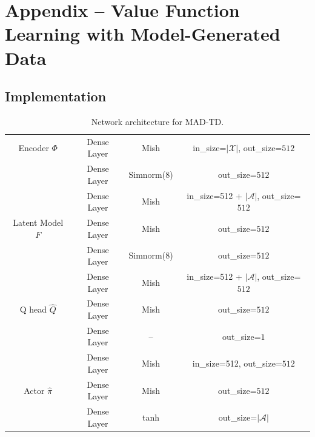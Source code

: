 \chapter{Appendix -- Value Function Learning with Model-Generated Data}

\section{Implementation}
\label{app:implementation}

\begin{table}[t]
\begin{center}
\begin{tabular}{c|c|c|c}
     Encoder $\Phi$ & Dense Layer & Mish & in\_size=$|\mathcal{X}|$, out\_size=$512$ \\
     & Dense Layer & Simnorm(8) & out\_size=$512$\\\hline
     
     & Dense Layer & Mish &in\_size=512 + $|\mathcal{A}|$, out\_size=$512$ \\
     Latent Model $F$ & Dense Layer & Mish & out\_size=$512$\\\
     & Dense Layer & Simnorm(8) &out\_size=$512$\\\hline
     
     & Dense Layer & Mish &in\_size=512 + $|\mathcal{A}|$, out\_size=$512$ \\
     Q head $\hat{Q}$& Dense Layer & Mish & out\_size=$512$\\
     & Dense Layer & -- & out\_size=$1$\\\hline

     & Dense Layer & Mish &in\_size=512, out\_size=$512$ \\
     Actor $\hat{\pi}$& Dense Layer & Mish & out\_size=$512$\\
     & Dense Layer & tanh & out\_size=$|\mathcal{A}|$
\end{tabular}
\end{center}
\caption{Network architecture for MAD-TD.}
\label{tab:arch}
\end{table}

